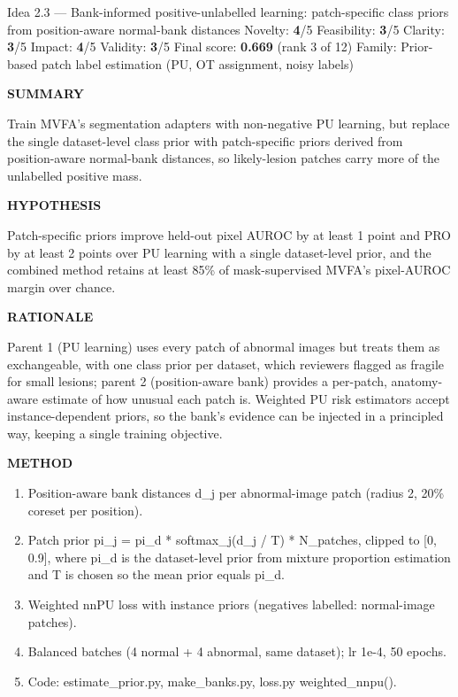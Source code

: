 \documentclass[11pt,a4paper]{article}
\newcommand{\lbl}[1]{{\sffamily\footnotesize\bfseries\color{muted}\MakeUppercase{#1}}\par}
\begin{document}
\begin{ideabox}{Idea 2.3 — Bank-informed positive-unlabelled learning: patch-specific class priors from position-aware normal-bank distances}
{\small Novelty: \textbf{4}/5 \quad Feasibility: \textbf{3}/5 \quad Clarity: \textbf{3}/5 \quad Impact: \textbf{4}/5 \quad Validity: \textbf{3}/5 \quad Final score: \textbf{0.669} (rank 3 of 12) \quad Family: Prior-based patch label estimation (PU, OT assignment, noisy labels)}\par\smallskip
\lbl{Summary}Train MVFA's segmentation adapters with non-negative PU learning, but replace the single dataset-level class prior with patch-specific priors derived from position-aware normal-bank distances, so likely-lesion patches carry more of the unlabelled positive mass.

\lbl{Hypothesis}Patch-specific priors improve held-out pixel AUROC by at least 1 point and PRO by at least 2 points over PU learning with a single dataset-level prior, and the combined method retains at least 85\% of mask-supervised MVFA's pixel-AUROC margin over chance.

\lbl{Rationale}Parent 1 (PU learning) uses every patch of abnormal images but treats them as exchangeable, with one class prior per dataset, which reviewers flagged as fragile for small lesions; parent 2 (position-aware bank) provides a per-patch, anatomy-aware estimate of how unusual each patch is. Weighted PU risk estimators accept instance-dependent priors, so the bank's evidence can be injected in a principled way, keeping a single training objective.

\lbl{Method}\begin{enumerate}[leftmargin=1.6em,itemsep=1pt,topsep=2pt]
\item Position-aware bank distances d\_\allowbreak{}j per abnormal-image patch (radius 2, 20\% coreset per position).
\item Patch prior pi\_\allowbreak{}j = pi\_\allowbreak{}d * softmax\_\allowbreak{}j(d\_\allowbreak{}j / T) * N\_\allowbreak{}patches, clipped to [0, 0.9], where pi\_\allowbreak{}d is the dataset-level prior from mixture proportion estimation and T is chosen so the mean prior equals pi\_\allowbreak{}d.
\item Weighted nnPU loss with instance priors (negatives labelled: normal-image patches).
\item Balanced batches (4 normal + 4 abnormal, same dataset); lr 1e-4, 50 epochs.
\item Code: estimate\_\allowbreak{}prior.py, make\_\allowbreak{}banks.py, loss.py weighted\_\allowbreak{}nnpu().
\end{enumerate}


\end{ideabox}
\end{document}
